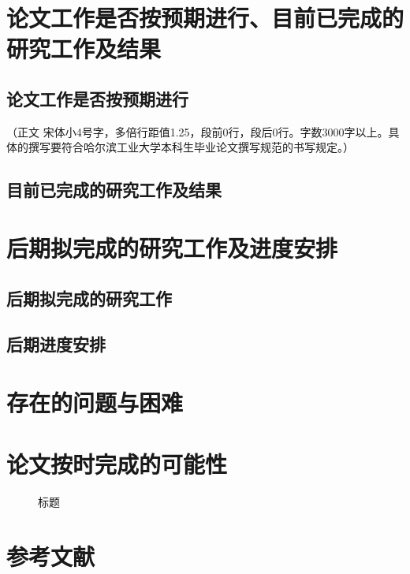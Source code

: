 \section{论文工作是否按预期进行、目前已完成的研究工作及结果}
\subsection{论文工作是否按预期进行}
（正文  宋体小4号字，多倍行距值1.25，段前0行，段后0行。字数3000字以上。具体的撰写要符合哈尔滨工业大学本科生毕业论文撰写规范的书写规定。）
\subsection{目前已完成的研究工作及结果}
\section{后期拟完成的研究工作及进度安排}
\subsection{后期拟完成的研究工作}
\subsection{后期进度安排}
\section{存在的问题与困难}
\section{论文按时完成的可能性}
\begin{figure}
    \caption{标题}
\end{figure}
\section{参考文献}




